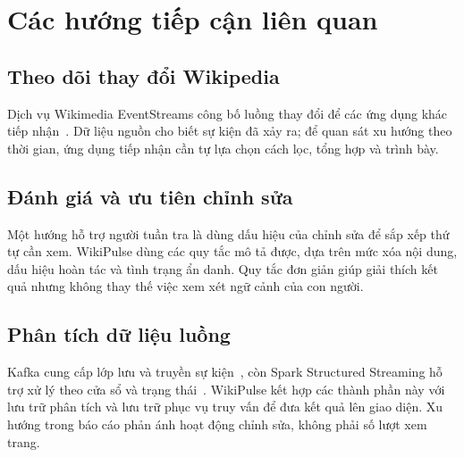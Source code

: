 \chapter{Các hướng tiếp cận liên quan}\label{chap:lienquan}
\section{Theo dõi thay đổi Wikipedia}
Dịch vụ Wikimedia EventStreams công bố luồng thay đổi để các ứng dụng khác tiếp nhận~\cite{eventstreams}. Dữ liệu nguồn cho biết sự kiện đã xảy ra; để quan sát xu hướng theo thời gian, ứng dụng tiếp nhận cần tự lựa chọn cách lọc, tổng hợp và trình bày.
\section{Đánh giá và ưu tiên chỉnh sửa}
Một hướng hỗ trợ người tuần tra là dùng dấu hiệu của chỉnh sửa để sắp xếp thứ tự cần xem. WikiPulse dùng các quy tắc mô tả được, dựa trên mức xóa nội dung, dấu hiệu hoàn tác và tình trạng ẩn danh. Quy tắc đơn giản giúp giải thích kết quả nhưng không thay thế việc xem xét ngữ cảnh của con người.
\section{Phân tích dữ liệu luồng}
Kafka cung cấp lớp lưu và truyền sự kiện~\cite{kreps2011}, còn Spark Structured Streaming hỗ trợ xử lý theo cửa sổ và trạng thái~\cite{armbrust2018}. WikiPulse kết hợp các thành phần này với lưu trữ phân tích và lưu trữ phục vụ truy vấn để đưa kết quả lên giao diện. Xu hướng trong báo cáo phản ánh hoạt động chỉnh sửa, không phải số lượt xem trang.
